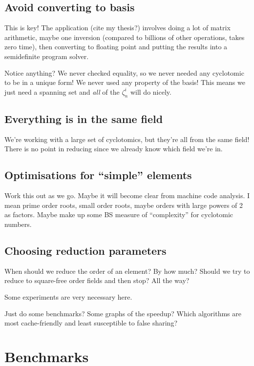 \documentclass{article}
\begin{document}
\subsection{Avoid converting to basis}

This is key! The application (cite my thesis?) involves doing a lot of
matrix arithmetic, maybe one inversion (compared to billions of other
operations, takes zero time), then converting to floating point and
putting the results into a semidefinite program solver.

Notice anything? We never checked equality, so we never needed any
cyclotomic to be in a unique form! We never used any property of the
basis! This means we just need a spanning set and \emph{all} of the
$\zeta_n^i$ will do nicely.

\subsection{Everything is in the same field}

We're working with a large set of cyclotomics, but they're all from
the same field! There is no point in reducing since we already know
which field we're in.

\subsection{Optimisations for ``simple'' elements}

Work this out as we go. Maybe it will become clear from machine code
analysis. I mean prime order roots, small order roots, maybe orders
with large powers of 2 as factors. Maybe make up some BS measure of
``complexity'' for cyclotomic numbers.

\subsection{Choosing reduction parameters}

When should we reduce the order of an element? By how much? Should we
try to reduce to square-free order fields and then stop? All the way?

Some experiments are very necessary here.

Just do some benchmarks? Some graphs of the speedup? Which algorithms
are most cache-friendly and least susceptible to false sharing?

\section{Benchmarks}
\end{document}
